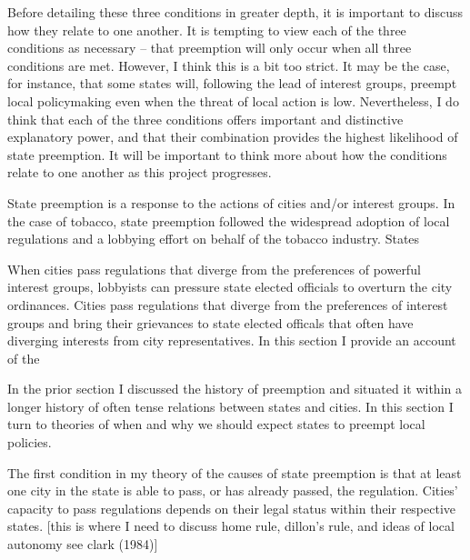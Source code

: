 \documentclass[12pt]{article}
\begin{document}
Before detailing these three conditions in greater depth, it is important to discuss how they relate to one another. It is tempting to view each of the three conditions as necessary -- that preemption will only occur when all three conditions are met. However, I think this is a bit too strict. It may be the case, for instance, that some states will, following the lead of interest groups, preempt local policymaking even when the threat of local action is low. Nevertheless, I do think that each of the three conditions offers important and distinctive explanatory power, and that their combination provides the highest likelihood of state preemption. It will be important to think more about how the conditions relate to one another as this project progresses.



State preemption is a response to the actions of cities and/or interest groups. In the case of tobacco, state preemption followed the widespread adoption of local regulations and a lobbying effort on behalf of the tobacco industry. States


When cities pass regulations that diverge from the preferences of powerful interest groups, lobbyists can pressure state elected officials to overturn the city ordinances.   Cities pass regulations that diverge from the preferences of interest groups and bring their grievances to state elected officals that often have diverging interests from city representatives. In this section I provide an account of the 


In the prior section I discussed the history of preemption and situated it within a longer history of often tense relations between states and cities. In this section I turn to theories of when and why we should expect states to preempt local policies. 

The first condition in my theory of the causes of state preemption is that at least one city in the state is able to pass, or has already passed, the regulation. Cities' capacity to pass regulations depends on their legal status within their respective states. [this is where I need to discuss home rule, dillon's rule, and ideas of local autonomy see clark (1984)]
\end{document}
